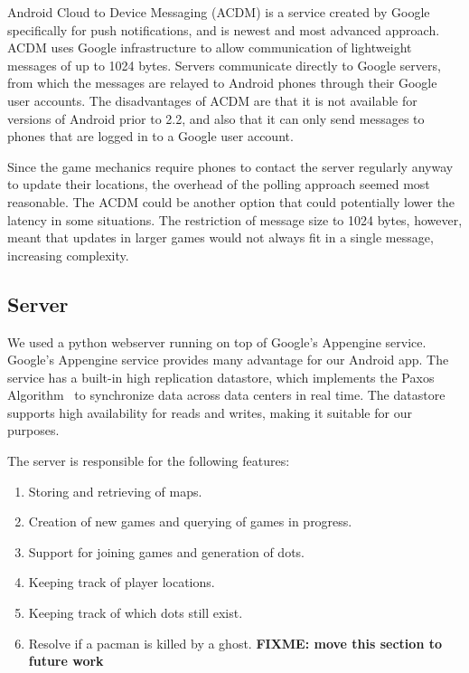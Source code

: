 \documentclass{acm_proc_article-sp}
\newcommand{\FIXME}[1]{{\color{red}\textbf{FIXME: #1}}}
\begin{document}
Android Cloud to Device Messaging (ACDM) is a service created by Google
specifically for push notifications, and is newest and most advanced approach.
ACDM uses Google infrastructure to allow communication of lightweight messages
of up to 1024 bytes. Servers communicate directly to Google servers, from which
the messages are relayed to Android phones through their Google user accounts.
The disadvantages of ACDM are that it is not available for versions of Android
prior to 2.2, and also that it can only send messages to phones that are logged
in to a Google user account.

Since the game mechanics require phones to contact the server regularly anyway
to update their locations, the overhead of the polling approach seemed most
reasonable. The ACDM could be another option that could potentially lower the
latency in some situations. The restriction of message size to 1024 bytes,
however, meant that updates in larger games would not always fit in a single
message, increasing complexity.


\subsection{Server}

We used a python webserver running on top of Google's Appengine
service. Google's Appengine service provides many advantage for our
Android app. The service has a built-in high replication datastore,
which implements the Paxos Algorithm~\cite{lamport01paxos} to
synchronize data across data centers in real time. The datastore
supports high availability for reads and writes, making it suitable
for our purposes.

The server is responsible for the following features:
\begin{enumerate}
\item Storing and retrieving of maps.
\item Creation of new games and querying of games in progress.
\item Support for joining games and generation of dots.
\item Keeping track of player locations.
\item Keeping track of which dots still exist.
\item Resolve if a pacman is killed by a ghost. \FIXME{move this section to future work}
\end{enumerate}
\end{document}
